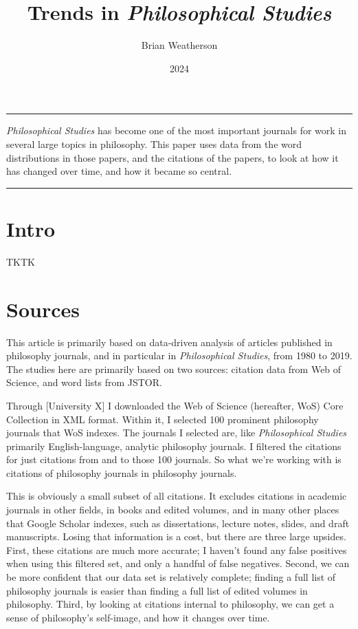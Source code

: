 \documentclass[
  10pt,
  letterpaper,
  DIV=11,
  numbers=noendperiod,
  twoside]{scrartcl}
\title{Trends in \emph{Philosophical Studies}}
\author{Brian Weatherson}
\date{2024}
\renewenvironment{abstract}
 {\vspace{-1.25cm}
 \quotation\small\noindent\rule{\linewidth}{.5pt}\par\smallskip
 \noindent }
 {\par\noindent\rule{\linewidth}{.5pt}\endquotation}
\begin{document}
\maketitle
\begin{abstract}
\emph{Philosophical Studies} has become one of the most important
journals for work in several large topics in philosophy. This paper uses
data from the word distributions in those papers, and the citations of
the papers, to look at how it has changed over time, and how it became
so central.
\end{abstract}


\section{Intro}\label{intro}

TKTK

\section{Sources}\label{sec-sources}

This article is primarily based on data-driven analysis of articles
published in philosophy journals, and in particular in
\emph{Philosophical Studies}, from 1980 to 2019. The studies here are
primarily based on two sources: citation data from Web of Science, and
word lists from JSTOR.

Through {[}University X{]} I downloaded the Web of Science (hereafter,
WoS) Core Collection in XML format. Within it, I selected 100 prominent
philosophy journals that WoS indexes. The journals I selected are, like
\emph{Philosophical Studies} primarily English-language, analytic
philosophy journals. I filtered the citations for just citations from
and to those 100 journals. So what we're working with is citations of
philosophy journals in philosophy journals.

This is obviously a small subset of all citations. It excludes citations
in academic journals in other fields, in books and edited volumes, and
in many other places that Google Scholar indexes, such as dissertations,
lecture notes, slides, and draft manuscripts. Losing that information is
a cost, but there are three large upsides. First, these citations are
much more accurate; I haven't found any false positives when using this
filtered set, and only a handful of false negatives. Second, we can be
more confident that our data set is relatively complete; finding a full
list of philosophy journals is easier than finding a full list of edited
volumes in philosophy. Third, by looking at citations internal to
philosophy, we can get a sense of philosophy's self-image, and how it
changes over time.
\end{document}

